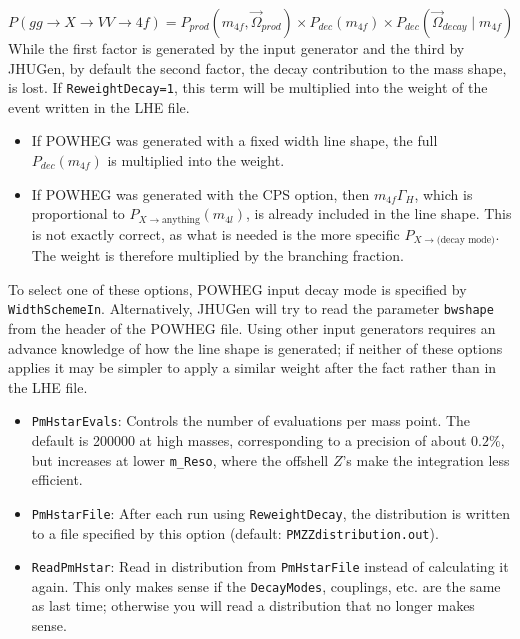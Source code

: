 \documentclass[aps,superscriptaddress,nofootinbib]{revtex4}
\begin{document}
\begin{itemize}
\[
P(gg\to X\to VV\to 4f)=P_{prod}(m_{4f},\vec{\Omega}_{prod})\times P_{dec}(m_{4f})\times P_{dec}(\vec{\Omega}_{decay}\mid m_{4f})
\]
While the first factor is generated by the input generator and the third by JHUGen, by default the second factor, the decay contribution to the mass shape, is lost.  If \verb|ReweightDecay=1|, this term will be multiplied into the weight of the event written in the LHE file.
\begin{itemize}
\item If POWHEG was generated with a fixed width line shape, the full $P_{dec}(m_{4f})$ is multiplied into the weight.
\item If POWHEG was generated with the CPS option, then $m_{4f}\Gamma_H$, which is proportional to $P_{X\to \text{anything}}(m_{4l})$, is already included in the line shape.  This is not exactly correct, as what is needed is the more specific $P_{X\to\text{(decay mode)}}$.  The weight is therefore multiplied by the branching fraction.
\end{itemize}
To select one of these options, POWHEG input decay mode is specified by \verb|WidthSchemeIn|.  Alternatively, JHUGen will try to read the parameter \verb|bwshape| from the header of the POWHEG file.  Using other input generators requires an advance knowledge of how the line shape is generated; if neither of these options applies it may be simpler to apply a similar weight after the fact rather than in the LHE file.
\begin{itemize}
\item \verb|PmHstarEvals|: Controls the number of evaluations per mass point.  The default is 200000 at high masses, corresponding to a precision of about $0.2\%$, but increases at lower \verb|m_Reso|, where the offshell $Z$'s make the integration less efficient.
\item \verb|PmHstarFile|: After each run using \verb|ReweightDecay|, the distribution is written to a file specified by this option (default: \verb|PMZZdistribution.out|).
\item \verb|ReadPmHstar|: Read in distribution from \verb|PmHstarFile| instead of calculating it again.  This only makes sense if the \verb|DecayModes|, couplings, etc. are the same as last time; otherwise you will read a distribution that no longer makes sense.
\end{itemize}

\end{itemize}
\end{document}
